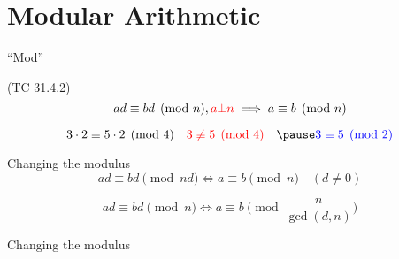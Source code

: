 \section{Modular Arithmetic}

\begin{frame}{``Mod''}
  \begin{exampleblock}{(TC 31.4.2)}
	\[
	  ad \equiv bd \pmod{n}, \textcolor{red}{a \bot n} \implies a \equiv b \pmod{n} 
	\]
  \end{exampleblock}

  \[
	3 \cdot 2 \equiv 5 \cdot 2 \pmod{4} \quad \textcolor{red}{3 \not\equiv 5 \pmod{4}} \quad \pause \textcolor{blue}{3 \equiv 5 \pmod{2}}
  \]
\end{frame}
\begin{frame}{Changing the modulus}
  \[
	ad \equiv bd \pmod{nd} \iff a \equiv b \pmod{n} \quad (d \neq 0)
  \]

  \[
	ad \equiv bd \pmod{n} \iff a \equiv b \pmod{\frac{n}{\gcd(d,n)}}
  \]
\end{frame}
\begin{frame}{Changing the modulus}
\end{frame}

